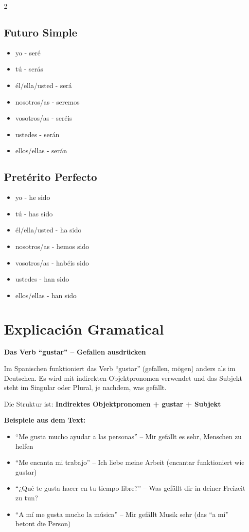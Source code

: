 \documentclass[12pt,a4paper]{article}
\begin{document}
\begin{multicols}{2}
\subsection*{Futuro Simple}
\begin{itemize}[leftmargin=*]
    \item yo - seré
    \item tú - serás
    \item él/ella/usted - será
    \item nosotros/as - seremos
    \item vosotros/as - seréis
    \item ustedes - serán
    \item ellos/ellas - serán
\end{itemize}

\subsection*{Pretérito Perfecto}
\begin{itemize}[leftmargin=*]
    \item yo - he sido
    \item tú - has sido
    \item él/ella/usted - ha sido
    \item nosotros/as - hemos sido
    \item vosotros/as - habéis sido
    \item ustedes - han sido
    \item ellos/ellas - han sido
\end{itemize}

\end{multicols}

\newpage

\section*{Explicación Gramatical}

\textbf{Das Verb \enquote{gustar} -- Gefallen ausdrücken}

Im Spanischen funktioniert das Verb \enquote{gustar} (gefallen, mögen) anders als im Deutschen. Es wird mit indirekten Objektpronomen verwendet und das Subjekt steht im Singular oder Plural, je nachdem, was gefällt.

Die Struktur ist: \textbf{Indirektes Objektpronomen + gustar + Subjekt}

\textbf{Beispiele aus dem Text:}
\begin{itemize}[leftmargin=*]
    \item \enquote{Me gusta mucho ayudar a las personas} -- Mir gefällt es sehr, Menschen zu helfen
    \item \enquote{Me encanta mi trabajo} -- Ich liebe meine Arbeit (encantar funktioniert wie gustar)
    \item \enquote{¿Qué te gusta hacer en tu tiempo libre?} -- Was gefällt dir in deiner Freizeit zu tun?
    \item \enquote{A mí me gusta mucho la música} -- Mir gefällt Musik sehr (das \enquote{a mí} betont die Person)
\end{itemize}
\end{document}
